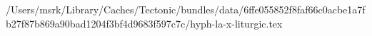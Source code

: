 /Users/msrk/Library/Caches/Tectonic/bundles/data/6ffe055852f8faf66c0acbe1a7fb27f87b869a90bad1204f3bf4d9683f597c7c/hyph-la-x-liturgic.tex